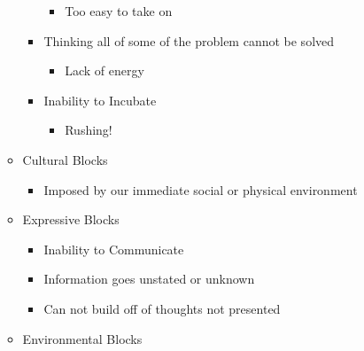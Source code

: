 \begin{itemize}
\begin{itemize}
\begin{itemize}
            \begin{itemize}

              \item Too easy to take on

            \end{itemize}

          \item Thinking all of some of the problem cannot be solved

            \begin{itemize}

              \item Lack of energy

            \end{itemize}

          \item Inability to Incubate

            \begin{itemize}

              \item Rushing!

            \end{itemize}

        \end{itemize}

      \item Cultural Blocks

        \begin{itemize}

          \item Imposed by our immediate social or physical environment

        \end{itemize}

      \item Expressive Blocks

        \begin{itemize}

          \item Inability to Communicate

          \item Information goes unstated or unknown

          \item Can not build off of thoughts not presented

        \end{itemize}

      \item Environmental Blocks


\end{itemize}
\end{itemize}

